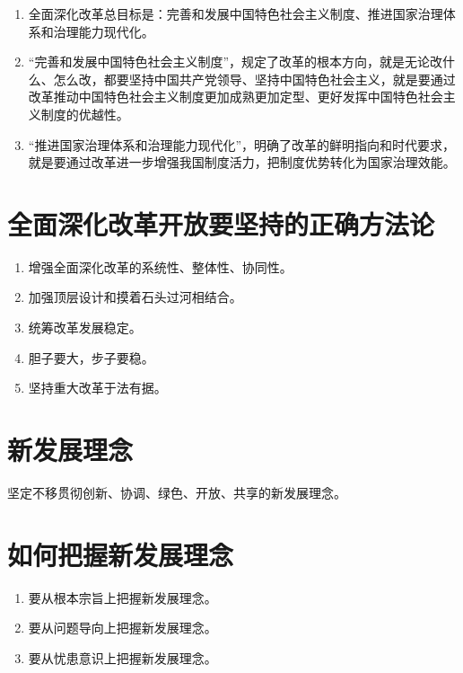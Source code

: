 \documentclass[12pt, a4paper, oneside]{ctexbook}
\begin{document}
\begin{enumerate}
\item 全面深化改革总目标是：完善和发展中国特色社会主义制度、推进国家治理体系和治理能力现代化。

\item “完善和发展中国特色社会主义制度”，规定了改革的根本方向，就是无论改什么、怎么改，都要坚持中国共产党领导、坚持中国特色社会主义，就是要通过改革推动中国特色社会主义制度更加成熟更加定型、更好发挥中国特色社会主义制度的优越性。

\item “推进国家治理体系和治理能力现代化”，明确了改革的鲜明指向和时代要求，就是要通过改革进一步增强我国制度活力，把制度优势转化为国家治理效能。
\end{enumerate}

\section{全面深化改革开放要坚持的正确方法论}
\begin{enumerate}
\item 增强全面深化改革的系统性、整体性、协同性。

\item 加强顶层设计和摸着石头过河相结合。

\item 统筹改革发展稳定。

\item 胆子要大，步子要稳。

\item 坚持重大改革于法有据。
\end{enumerate}

\section{新发展理念}

坚定不移贯彻创新、协调、绿色、开放、共享的新发展理念。

\section{如何把握新发展理念}

\begin{enumerate}
\item 要从根本宗旨上把握新发展理念。

\item 要从问题导向上把握新发展理念。

\item 要从忧患意识上把握新发展理念。
\end{enumerate}
\end{document}
